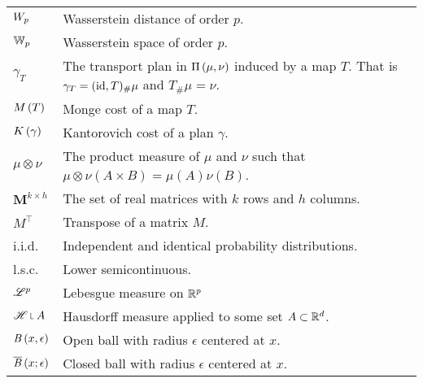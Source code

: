 \begin{tabular}{ l l }
	$W_{p}$ & Wasserstein distance of order $p$. \\	
	$\mathbb{W}_{p}$ & Wasserstein space of order $p$.\\
 	$\gamma_T$ & The transport plan in $\Pi\left(\mu, \nu\right)$ induced by a map $T$. That is $\gamma_T = (\mathrm{id}, T)_\#\mu$ and $T_\#\mu=\nu$. \\
	$M\left(T\right)$ & Monge cost of a map $T$. \\
	$K\left(\gamma\right)$ & Kantorovich cost of a plan $\gamma$. \\	
	$\mu \otimes \nu$ & The product measure of $\mu$ and $\nu$ such that $\mu \otimes \nu (A\times B)= \mu(A)\nu(B)$.\\
	$\mathbf{M}^{k\times h}$ & The set of real matrices with $k$ rows and $h$ columns. \\
	$M^\top$ & Transpose of a matrix $M$. \\
	i.i.d. & Independent and identical probability distributions.\\
	l.s.c. & Lower semicontinuous. \\
	$\mathscr{L}^p$ & Lebesgue measure on $\mathbb{R}^p$\\
	$\Hausdorff\measurerestr A$ & Hausdorff measure applied to some set $A \subset \mathbb{R}^d$. \\
	$\mathit{B}\left( x, \epsilon \right)$ & Open ball with radius $\epsilon$ centered at $x$.\\
	$\overline{\mathit{B}}\left( x;\epsilon \right) $ & Closed ball with radius $\epsilon$ centered at $x$.\\	
\end{tabular}
